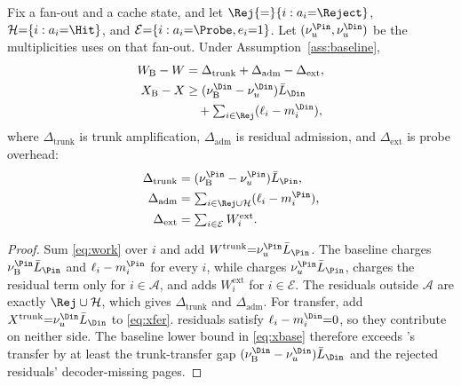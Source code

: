 \begin{proposition}
\label{prop:acct}
Fix a fan-out and a cache state, and let $\Rej{=}\{i:a_i{=}\Reject\}$, $\mathcal{H}{=}\{i:a_i{=}\Hit\}$, and $\mathcal{E}{=}\{i:a_i{=}\Probe,e_i{=}1\}$.
Let $(\nu_u^{\Pin},\nu_u^{\Din})$ be the multiplicities \sys uses on that fan-out.
Under Assumption~\ref{ass:baseline},
\begin{align}
W_{\mathrm{B}}-W &= \Delta_{\mathrm{trunk}}+\Delta_{\mathrm{adm}}-\Delta_{\mathrm{ext}}, \label{eq:acct}\\
X_{\mathrm{B}}-X &\ge (\nu_{\mathrm{B}}^{\Din}-\nu_u^{\Din})\bar L_{\Din} \nonumber\\
&\quad +\textstyle\sum_{i\in\Rej}(\ell_i-m_i^{\Din}), \label{eq:xacct}
\end{align}
where $\Delta_{\mathrm{trunk}}$ is trunk amplification, $\Delta_{\mathrm{adm}}$ is residual admission, and $\Delta_{\mathrm{ext}}$ is probe overhead:
\begin{equation}
\label{eq:deltas}
\begin{aligned}
\Delta_{\mathrm{trunk}} &= (\nu_{\mathrm{B}}^{\Pin}-\nu_u^{\Pin})\bar L_{\Pin},\\
\Delta_{\mathrm{adm}} &= \textstyle\sum_{i\in\Rej\cup\mathcal{H}}(\ell_i-m_i^{\Pin}),\\
\Delta_{\mathrm{ext}} &= \textstyle\sum_{i\in\mathcal{E}}W_i^{\mathrm{ext}}.
\end{aligned}
\end{equation}
\end{proposition}

\begin{proof}
Sum \eqref{eq:work} over $i$ and add $W^{\mathrm{trunk}}{=}\nu_u^{\Pin}\bar L_{\Pin}$.
The baseline charges $\nu_{\mathrm{B}}^{\Pin}\bar L_{\Pin}$ and $\ell_i-m_i^{\Pin}$ for every $i$, while \sys charges $\nu_u^{\Pin}\bar L_{\Pin}$, charges the residual term only for $i\in\mathcal{A}$, and adds $W_i^{\mathrm{ext}}$ for $i\in\mathcal{E}$.
The residuals outside $\mathcal{A}$ are exactly $\Rej\cup\mathcal{H}$, which gives $\Delta_{\mathrm{trunk}}$ and $\Delta_{\mathrm{adm}}$.
For transfer, add $X^{\mathrm{trunk}}{=}\nu_u^{\Din}\bar L_{\Din}$ to \eqref{eq:xfer}.
\Hit residuals satisfy $\ell_i-m_i^{\Din}{=}0$, so they contribute on neither side.
The baseline lower bound in \eqref{eq:xbase} therefore exceeds \sys's transfer by at least the trunk-transfer gap $(\nu_{\mathrm{B}}^{\Din}-\nu_u^{\Din})\bar L_{\Din}$ and the rejected residuals' decoder-missing pages.
\end{proof}


